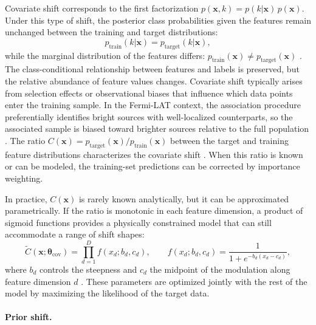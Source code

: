 Covariate shift corresponds to the first factorization $p(\mathbf{x}, k) = p(k|\mathbf{x})\,p(\mathbf{x})$. Under this type of shift, the posterior class probabilities given the features remain unchanged between the training and target distributions:
\begin{equation}
p_{\text{train}}(k|\mathbf{x}) = p_{\text{target}}(k|\mathbf{x}),
\label{eq:covariate_shift}
\end{equation}
while the marginal distribution of the features differs: $p_{\text{train}}(\mathbf{x}) \neq p_{\text{target}}(\mathbf{x})$ \cite{MorenoTorres:2012}. The class-conditional relationship between features and labels is preserved, but the relative abundance of feature values changes. Covariate shift typically arises from selection effects or observational biases that influence which data points enter the training sample. In the Fermi-LAT context, the association procedure preferentially identifies bright sources with well-localized counterparts, so the associated sample is biased toward brighter sources relative to the full population \cite{Malyshev:2023}. The ratio $C(\mathbf{x}) = p_{\text{target}}(\mathbf{x})/p_{\text{train}}(\mathbf{x})$ between the target and training feature distributions characterizes the covariate shift \cite{Amerio:2025sub}. When this ratio is known or can be modeled, the training-set predictions can be corrected by importance weighting.

In practice, $C(\mathbf{x})$ is rarely known analytically, but it can be approximated parametrically. If the ratio is monotonic in each feature dimension, a product of sigmoid functions provides a physically constrained model that can still accommodate a range of shift shapes:
\begin{equation}
\tilde{C}(\mathbf{x};\boldsymbol{\theta}_{\text{cov}}) = \prod_{d=1}^{D} f(x_d; b_d, c_d), \qquad f(x_d; b_d, c_d) = \frac{1}{1 + e^{-b_d(x_d - c_d)}},
\label{eq:sigmoid_modulation}
\end{equation}
where $b_d$ controls the steepness and $c_d$ the midpoint of the modulation along feature dimension $d$ \cite{Amerio:2025sub}. These parameters are optimized jointly with the rest of the model by maximizing the likelihood of the target data.

\paragraph{Prior shift.}

